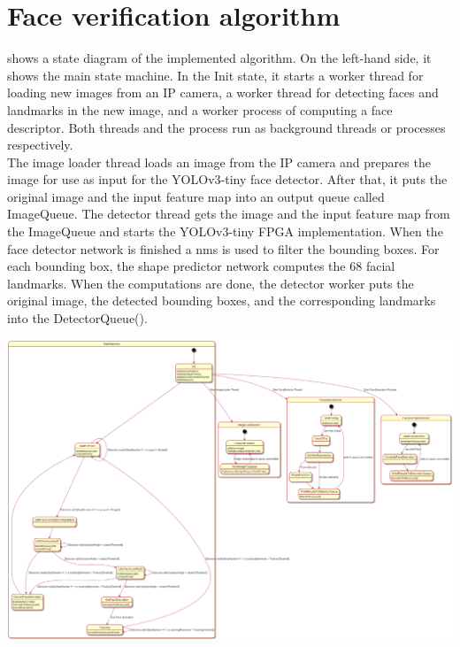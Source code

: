 \documentclass[%
a4paper,
twoside,
openany,
dvipsnames
]
{report}
\let\svfigure\figure
\let\svendfigure\endfigure
\renewenvironment{figure}[1][tb]{\svfigure[#1]\setstretch{1}}
{\svendfigure}
\begin{document}
\section{Face verification algorithm}
 shows a state diagram of the implemented algorithm. On the left-hand side, it shows the main state machine. In the Init state, it starts a worker thread for loading new images from an IP camera, a worker thread for detecting faces and landmarks in the new image, and a worker process of computing a face descriptor. Both threads and the process run as background threads or processes respectively. \\
The image loader thread loads an image from the IP camera and prepares the image for use as input for the YOLOv3-tiny face detector. After that, it puts the original image and the input feature map into an output queue called ImageQueue. The detector thread gets the image and the input feature map from the ImageQueue and starts the YOLOv3-tiny \gls{FPGA} implementation. When the face detector network is finished a \gls{nms} is used to filter the bounding boxes. For each bounding box, the shape predictor network computes the 68 facial landmarks. When the computations are done, the detector worker puts the original image, the detected bounding boxes, and the corresponding landmarks into the DetectorQueue().
\begin{landscape}
	\begin{figure}[h]
		\centering
		\includegraphics[width=1.5\textwidth]{../sources/graphics/StateMachine.png}
		\caption[Face verification system algorithm]{Face verification system algorithm. Main state machine and workers for loading an image, for detection faces and landmarks and for computing the face descriptor.}
		\label{fig:statemachine}
	\end{figure} 
\end{landscape}
\end{document}
